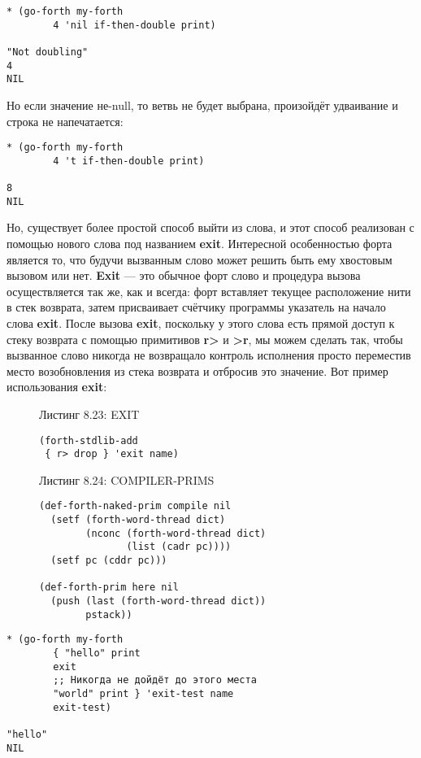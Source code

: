 \begin{verbatim}
* (go-forth my-forth
	    4 'nil if-then-double print)

"Not doubling" 
4 
NIL
\end{verbatim}

Но если значение не-null, то ветвь не будет выбрана, произойдёт удваивание и строка не напечатается:

\begin{verbatim}
* (go-forth my-forth
	    4 't if-then-double print)

8 
NIL
\end{verbatim}

Но, существует более простой способ выйти из слова, и этот способ реализован с помощью нового слова под названием \textbf{exit}. Интересной особенностью форта является то, что будучи вызванным слово может решить быть ему хвостовым вызовом или нет. \textbf{Exit} --- это обычное форт слово и процедура вызова осуществляется так же, как и всегда: форт вставляет текущее расположение нити в стек возврата, затем присваивает счётчику программы указатель на начало слова \textbf{exit}. После вызова \textbf{exit}, поскольку у этого слова есть прямой доступ к стеку возврата с помощью примитивов \textbf{r>} и \textbf{>r}, мы можем сделать так, чтобы вызванное слово никогда не возвращало контроль исполнения просто переместив место возобновления из стека возврата и отбросив это значение. Вот пример использования \textbf{exit}:

\begin{figure}Листинг 8.23: EXIT\label{listing_8.23}
\listbegin
\begin{verbatim}
(forth-stdlib-add
 { r> drop } 'exit name)
\end{verbatim}
\listend
\end{figure}

\begin{figure}Листинг 8.24: COMPILER-PRIMS\label{listing_8.24}
\listbegin
\begin{verbatim}
(def-forth-naked-prim compile nil
  (setf (forth-word-thread dict)
        (nconc (forth-word-thread dict)
               (list (cadr pc))))
  (setf pc (cddr pc)))

(def-forth-prim here nil
  (push (last (forth-word-thread dict))
        pstack))
\end{verbatim}
\listend
\end{figure}

\begin{verbatim}
* (go-forth my-forth
	    { "hello" print
	    exit
	    ;; Никогда не дойдёт до этого места
	    "world" print } 'exit-test name
	    exit-test)

"hello" 
NIL
\end{verbatim}

